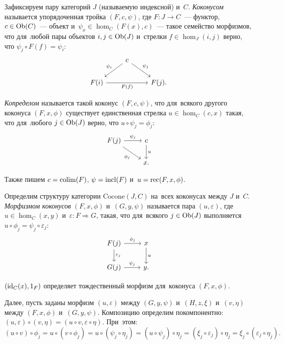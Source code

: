 \documentclass[a4paper,oneside]{article}
\begin{document}
\begin{example}
Зафиксируем пару категорий $J$ (называемую индексной) и~$C$. \textit{Коконусом} называется упорядоченная
тройка $(F, c, \psi)$, где $F : J \rightarrow C$~— функтор, $c \in \mathrm{Ob}(C)$~— объект
и~$\psi_x \in \hom_C(F(x), c)$~— такое семейство морфизмов, что для~любой
пары объектов $i, j \in \mathrm{Ob}(J)$ и~стрелки $f \in \hom_J(i, j)$ верно,
что $\psi_j \circ F(f) = \psi_i$:
\[
  \begin{tikzcd}
    &                               & \arrow{ld}{}[swap]{\psi_i} c \arrow{rd}{\psi_j} &       & \\
    & F(i) \arrow{rr}{}[swap]{F(f)} &                                                 & F(j). &
  \end{tikzcd}
\]

\textit{Копределом} называется такой коконус $(F, c, \psi)$, что для~всякого другого коконуса $(F, x, \phi)$
существует единственная стрелка $u \in \hom_C(c, x)$ такая, что для~любого $j \in \mathrm{Ob}(J)$
верно, что $u \circ \psi_j = \phi_j$:
\[
  \begin{tikzcd}
    F(j) \arrow{r}{\psi_j} \arrow{dr}{}[swap]{\phi_j} & \arrow{d}{u} c \\
                                                      & x.
  \end{tikzcd}
\]

Также пишем $c = \mathrm{colim}(F)$, $\psi = \mathrm{incl}(F)$ и~$u = \mathrm{rec}(F, x, \phi)$.

Определим структуру категории $\mathrm{Cocone}(J, C)$ на~всех коконусах между $J$ и~$C$.
\textit{Морфизмом коконусов} $(F, x, \phi)$ и~$(G, y, \psi)$ называется пара $(u, \varepsilon)$,
где $u \in \hom_C(x, y)$ и~$\varepsilon : F \Rightarrow G$, такая, что для~всякого $j \in \mathrm{Ob}(J)$
выполняется $u \circ \phi_j = \psi_j \circ \varepsilon_j$:
\[
  \begin{tikzcd}
    \arrow{d}{\varepsilon_j} F(j) \arrow{r}{\phi_j} & \arrow{d}{u} x \\
                             G(j) \arrow{r}{\psi_j} &              y.
  \end{tikzcd}
\]

$(\mathrm{id}_C(x), 1_F)$ определяет тождественный морфизм для~коконуса $(F, x, \phi)$.

Далее, пусть заданы морфизм $(u, \varepsilon)$ между $(G, y, \psi)$ и~$(H, z, \xi)$ и~$(v, \eta)$ между $(F, x, \phi)$ и~$(G, y, \psi)$.
Композицию определим покомпонентно: $(u, \varepsilon) \circ (v, \eta) = (u \circ v, \varepsilon \circ \eta)$.
При~этом:
\[
  (u \circ v) \circ \phi_j = u \circ (v \circ \phi_j)
                           = u \circ (\psi_j \circ \eta_j)
                           = (u \circ \psi_j) \circ \eta_j
                           = (\xi_j \circ \varepsilon_j) \circ \eta_j
                           = \xi_j \circ (\varepsilon_j \circ \eta_j).
\]


\end{example}
\end{document}
